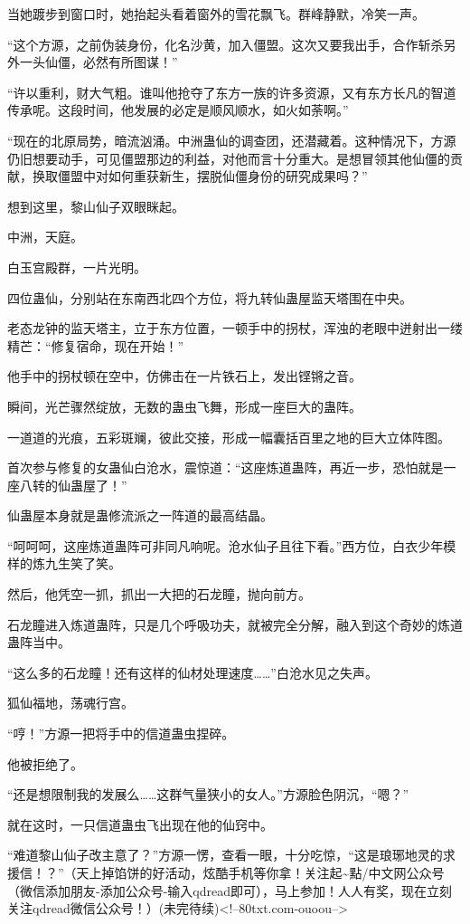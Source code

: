 \begin{this_body}
当她踱步到窗口时，她抬起头看着窗外的雪花飘飞。群峰静默，冷笑一声。

“这个方源，之前伪装身份，化名沙黄，加入僵盟。这次又要我出手，合作斩杀另外一头仙僵，必然有所图谋！”

“许以重利，财大气粗。谁叫他抢夺了东方一族的许多资源，又有东方长凡的智道传承呢。这段时间，他发展的必定是顺风顺水，如火如荼啊。”

“现在的北原局势，暗流汹涌。中洲蛊仙的调查团，还潜藏着。这种情况下，方源仍旧想要动手，可见僵盟那边的利益，对他而言十分重大。是想冒领其他仙僵的贡献，换取僵盟中对如何重获新生，摆脱仙僵身份的研究成果吗？”

想到这里，黎山仙子双眼眯起。

中洲，天庭。

白玉宫殿群，一片光明。

四位蛊仙，分别站在东南西北四个方位，将九转仙蛊屋监天塔围在中央。

老态龙钟的监天塔主，立于东方位置，一顿手中的拐杖，浑浊的老眼中迸射出一缕精芒：“修复宿命，现在开始！”

他手中的拐杖顿在空中，仿佛击在一片铁石上，发出铿锵之音。

瞬间，光芒骤然绽放，无数的蛊虫飞舞，形成一座巨大的蛊阵。

一道道的光痕，五彩斑斓，彼此交接，形成一幅囊括百里之地的巨大立体阵图。

首次参与修复的女蛊仙白沧水，震惊道：“这座炼道蛊阵，再近一步，恐怕就是一座八转的仙蛊屋了！”

仙蛊屋本身就是蛊修流派之一阵道的最高结晶。

“呵呵呵，这座炼道蛊阵可非同凡响呢。沧水仙子且往下看。”西方位，白衣少年模样的炼九生笑了笑。

然后，他凭空一抓，抓出一大把的石龙瞳，抛向前方。

石龙瞳进入炼道蛊阵，只是几个呼吸功夫，就被完全分解，融入到这个奇妙的炼道蛊阵当中。

“这么多的石龙瞳！还有这样的仙材处理速度……”白沧水见之失声。

狐仙福地，荡魂行宫。

“哼！”方源一把将手中的信道蛊虫捏碎。

他被拒绝了。

“还是想限制我的发展么……这群气量狭小的女人。”方源脸色阴沉，“嗯？”

就在这时，一只信道蛊虫飞出现在他的仙窍中。

“难道黎山仙子改主意了？”方源一愣，查看一眼，十分吃惊，“这是琅琊地灵的求援信！？”（天上掉馅饼的好活动，炫酷手机等你拿！关注起\~{}點/中文网公众号（微信添加朋友-添加公众号-输入qdread即可），马上参加！人人有奖，现在立刻关注qdread微信公众号！）(未完待续)<!--80txt.com-ouoou-->

\end{this_body}

